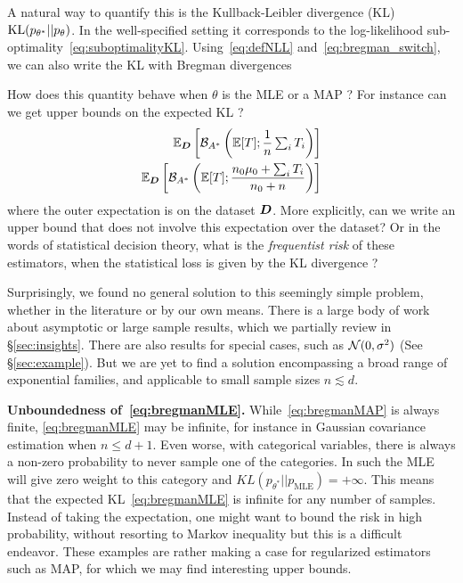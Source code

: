 \documentclass[twoside]{article}
\newcommand*{\expect}[2][]{\ensuremath{\mathbb{E}_{#1} \left[ #2 \right] }} %
\newcommand{\logpart}{A}
\newcommand{\bregman}{\cB_\logpart}
\newcommand{\bregmanconj}{\cB_{\logpart^*}}
\newcommand{\nat}{\theta}
\newcommand{\m}{\mu}
\begin{document}
A natural way to quantify this is the Kullback-Leibler divergence (KL) $\KL(p_{\nat^*} || p_\nat)$. %
In the well-specified setting it corresponds to the log-likelihood sub-optimality~\eqref{eq:suboptimalityKL}.
Using~\eqref{eq:defNLL} and~\eqref{eq:bregman_switch}, we can also write the KL with Bregman divergences
\alignn{
	\KL(p_{\nat^*} || p_\nat)
	 = \bregman(\nat ; \nat^*) 
	 = \bregmanconj(\m^* ; \m) \; .
}

How does this quantity behave when $\nat$ is the MLE or a MAP ? 
For instance can we get upper bounds on the expected KL ?
\begin{align}
	\label{eq:bregmanMLE}
	\expect[\mD]{\bregmanconj \left (\E [T] ;  \inv{n}  \smallsum_i T_i \right )} \\
	\label{eq:bregmanMAP}
	\expect[\mD]{\bregmanconj \left (\E [T] ; \frac{n_0 \m_0 + \smallsum_i T_i}{n_0+n} \right )}
\end{align}
where the outer expectation is on the dataset ${\bm{D}}$.
More explicitly, can we write an upper bound that does not involve this expectation over the dataset?
Or in the words of statistical decision theory, what is the \emph{frequentist risk} of these estimators, when the statistical loss is given by the KL divergence ?

Surprisingly, we found no general solution to this seemingly simple problem, whether in the literature or by our own means.
There is a large body of work about asymptotic or large sample results, which we partially review in \S\ref{sec:insights}.
There are also results for special cases, such as ${\mathcal N}(0, \sigma^2)$ (See \S\ref{sec:example}). 
But we are yet to find a solution encompassing a broad range of exponential families, and applicable to small sample sizes $n \lesssim d$.

{\bf Unboundedness of~\eqref{eq:bregmanMLE}.}
While~\eqref{eq:bregmanMAP} is always finite, \eqref{eq:bregmanMLE} may be infinite, 
for instance in Gaussian covariance estimation when $n \leq d + 1$.
Even worse, with categorical variables, there is always a non-zero probability to never sample one of the categories. In such the MLE will give zero weight to this category and $KL(p_{\nat^*} || p_\text{MLE} ) = +\infty$. 
This means that the expected KL~\eqref{eq:bregmanMLE} is infinite for any number of samples.
Instead of taking the expectation, one might want to bound the risk in high probability, without resorting to Markov inequality but this is a difficult endeavor.
These examples are rather making a case for regularized estimators such as MAP, for which we may find interesting upper bounds.
\end{document}
